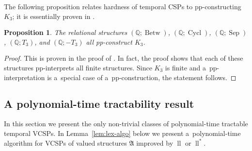 \documentclass[preprint,12pt]{elsarticle}
\newcommand{\N}{\mathbb N}
\newcommand{\Q}{\mathbb Q}
\newcommand{\bA}{{\mathfrak A}}
\DeclareMathOperator{\Cyc}{Cycl}
\DeclareMathOperator{\Aut}{Aut}
\DeclareMathOperator{\Opt}{Opt}
\DeclareMathOperator{\Feas}{Feas}
\DeclareMathOperator{\lele}{ll}
\DeclareMathOperator{\lex}{lex}
\DeclareMathOperator{\Betw}{Betw}
\DeclareMathOperator{\Sep}{Sep}
\newtheorem{proposition}[theorem]{Proposition}
\newtheorem{definition}[theorem]{Definition}
\begin{document}
The following proposition relates hardness of temporal CSPs to pp-con\-struct\-ing $K_3$; it is essentially proven in \cite[Theorem 12.0.1]{Book}. 

\begin{proposition} \label{prop:hard}
The relational structures $(\Q; \Betw)$, $(\Q; \Cyc)$, $(\Q; \Sep)$, $(\Q; T_3)$, and $(\Q; -T_3)$ all pp-construct $K_3$.
\end{proposition}

\begin{proof}
This is proven in the proof of \cite[Theorem 12.0.1]{Book}. 
In fact, the proof shows that each of these structures pp-interprets all finite structures. Since $K_3$ is finite and a~pp-interpretation is a~special case of a~pp-construction, the statement follows.
\end{proof}

\subsection{A polynomial-time tractability result}
\label{sect:tract}
In this section we present the only non-trivial classes of polynomial-time
tractable temporal VCSPs.
In Lemma~\ref{lem:lex-algo} below we present a~polynomial-time algorithm for VCSPs of valued structures $\bA$ improved by $\lele$ or $\lele^*$. 



\end{document}
